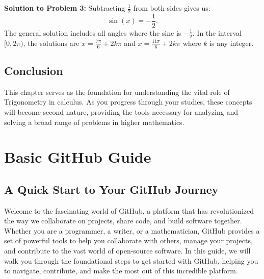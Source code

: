 \documentclass[a4paper,12pt]{book}
\newcounter{problem}
\begin{document}
\textbf{Solution to Problem 3:} Subtracting \( \frac{1}{2} \) from both sides gives us:
\[
\sin(x) = -\frac{1}{2}.
\]
The general solution includes all angles where the sine is \( -\frac{1}{2} \). In the interval \( [0, 2\pi) \), the solutions are \( x = \frac{7\pi}{6} + 2k\pi \) and \( x = \frac{11\pi}{6} + 2k\pi \) where \( k \) is any integer.





\section*{Conclusion}
\label{sec:trig_conclusion}
This chapter serves as the foundation for understanding the vital role of Trigonometry in calculus. As you progress through your studies, these concepts will become second nature, providing the tools necessary for analyzing and solving a broad range of problems in higher mathematics.






\clearpage
{}
\appendix
\renewcommand{\thechapter}{\Roman{chapter}} %

\chapter{Basic GitHub Guide}
\section*{A Quick Start to Your GitHub Journey}

Welcome to the fascinating world of GitHub, a platform that has revolutionized the way we collaborate on projects, share code, and build software together. Whether you are a programmer, a writer, or a mathematician, GitHub provides a set of powerful tools to help you collaborate with others, manage your projects, and contribute to the vast world of open-source software. In this guide, we will walk you through the foundational steps to get started with GitHub, helping you to navigate, contribute, and make the most out of this incredible platform.
\end{document}
